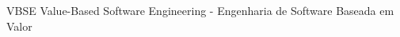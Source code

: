 \begin{siglas}
  \item VBSE Value-Based Software Engineering - Engenharia de Software Baseada em Valor
\end{siglas}
